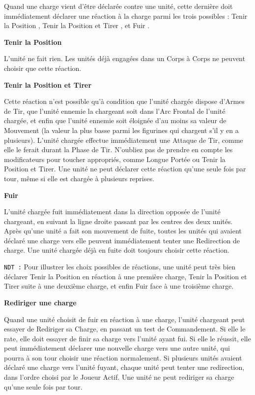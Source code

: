 Quand une charge vient d'être déclarée contre une unité, cette dernière doit immédiatement déclarer une réaction à la charge parmi les trois possibles : \og Tenir la Position \fg{}, \og Tenir la Position et Tirer \fg{}, et \og Fuir \fg{}.

\noindent\textbf{Tenir la Position}

L'unité ne fait rien. Les unités déjà engagées dans un Corps à Corps ne peuvent choisir que cette réaction.

\noindent\textbf{Tenir la Position et Tirer}

Cette réaction n'est possible qu'à condition que l'unité chargée dispose d'Armes de Tir, que l'unité ennemie la chargeant soit dans l'Arc Frontal de l'unité chargée, et enfin que l'unité ennemie soit éloignée d'au moins sa valeur de Mouvement (la valeur la plus basse parmi les figurines qui chargent s'il y en a plusieurs). L'unité chargée effectue immédiatement une Attaque de Tir, comme elle le ferait durant la Phase de Tir. N'oubliez pas de prendre en compte les modificateurs pour toucher appropriés, comme Longue Portée ou Tenir la Position et Tirer. Une unité ne peut déclarer cette réaction qu'une seule fois par tour, même si elle est chargée à plusieurs reprises.

\noindent\textbf{Fuir}

L'unité chargée fuit immédiatement dans la direction opposée de l'unité chargeant, en suivant la ligne droite passant par les centres des deux unités. Après qu'une unité a fait son mouvement de fuite, toutes les unités qui avaient déclaré une charge vers elle peuvent immédiatement tenter une Redirection de charge. Une unité chargée déjà en fuite doit toujours choisir cette réaction.

\texttt{NDT :} Pour illustrer les choix possibles de réactions, une unité peut très bien déclarer Tenir la Position en réaction à une première charge, Tenir la Position et Tirer suite à une deuxième charge, et enfin Fuir face à une troisième charge.

\noindent\textbf{Rediriger une charge}

Quand une unité choisit de fuir en réaction à une charge, l'unité chargeant peut essayer de Rediriger sa Charge, en passant un test de Commandement. Si elle le rate, elle doit essayer de finir sa charge vers l'unité ayant fui. Si elle le réussit, elle peut immédiatement déclarer une nouvelle charge vers une autre unité, qui pourra à son tour choisir une réaction normalement. Si plusieurs unités avaient déclaré une charge vers l'unité fuyant, chaque unité peut tenter une redirection, dans l'ordre choisi par le Joueur Actif. Une unité ne peut rediriger sa charge qu'une seule fois par tour. 

